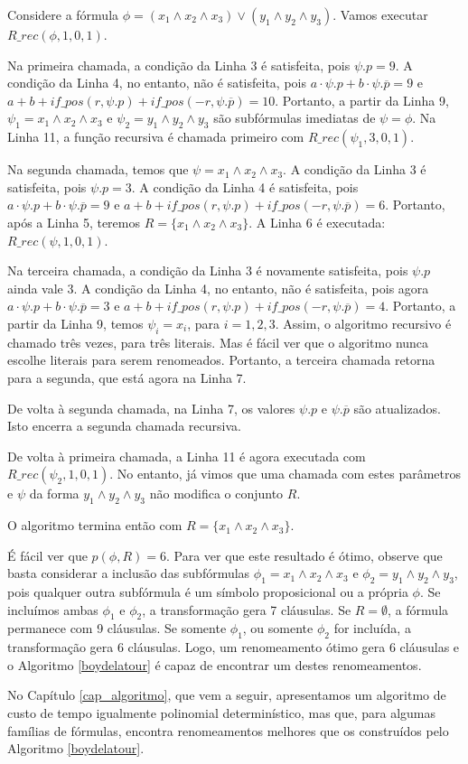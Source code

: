 \begin{example}
	Considere a fórmula $\phi = (x_1 \wedge x_2 \wedge x_3) \vee (y_1 \wedge y_2 \wedge y_3)$. Vamos executar $R\_rec(\phi,1,0,1)$.
	
	Na primeira chamada, a condição da Linha 3 é satisfeita, pois $\psi.p = 9$. A condição da Linha 4, no entanto, não é satisfeita, pois $a \cdot \psi.p + b \cdot \psi.\overline{p} = 9$ e $a + b + if\_pos(r,\psi.p) + if\_pos(-r,\psi.\overline{p}) = 10$. Portanto, a partir da Linha 9, $\psi_1 = x_1 \wedge x_2 \wedge x_3$ e $\psi_2 = y_1 \wedge y_2 \wedge y_3$ são subfórmulas imediatas de $\psi = \phi$. Na Linha 11, a função recursiva é chamada primeiro com $R\_rec(\psi_1,3,0,1)$.
	
	Na segunda chamada, temos que $\psi = x_1 \wedge x_2 \wedge x_3$. A condição da Linha 3 é satisfeita, pois $\psi.p = 3$. A condição da Linha 4 é satisfeita, pois $a \cdot \psi.p + b \cdot \psi.\overline{p} = 9$ e $a + b + if\_pos(r,\psi.p) + if\_pos(-r,\psi.\overline{p}) = 6$. Portanto, após a Linha 5, teremos $R = \{x_1 \wedge x_2 \wedge x_3 \}$. A Linha 6 é executada: $R\_rec(\psi,1,0,1)$.
	
	Na terceira chamada, a condição da Linha 3 é novamente satisfeita, pois $\psi.p$ ainda vale 3. A condição da Linha 4, no entanto, não é satisfeita, pois agora $a \cdot \psi.p + b \cdot \psi.\overline{p} = 3$ e $a + b + if\_pos(r,\psi.p) + if\_pos(-r,\psi.\overline{p}) = 4$. Portanto, a partir da Linha 9, temos $\psi_i = x_i$, para $i=1,2,3$. Assim, o algoritmo recursivo é chamado três vezes, para três literais. Mas é fácil ver que o algoritmo nunca escolhe literais para serem renomeados. Portanto, a terceira chamada retorna para a segunda, que está agora na Linha 7.
	
	De volta à segunda chamada, na Linha 7, os valores $\psi.p$ e $\psi.\overline{p}$ são atualizados. Isto encerra a segunda chamada recursiva.
	
	De volta à primeira chamada, a Linha 11 é agora executada com $R\_rec(\psi_2,1,0,1)$. No entanto, já vimos que uma chamada com estes parâmetros e $\psi$ da forma $y_1 \wedge y_2 \wedge y_3$ não modifica o conjunto $R$.
	
	O algoritmo termina então com $R = \{x_1 \wedge x_2 \wedge x_3 \}$.
	
	É fácil ver que $p(\phi,R) = 6$. Para ver que este resultado é ótimo, observe que basta considerar a inclusão das subfórmulas $\phi_1 = x_1 \wedge x_2 \wedge x_3$ e $\phi_2 = y_1 \wedge y_2 \wedge y_3$, pois qualquer outra subfórmula é um símbolo proposicional ou a própria $\phi$. Se incluímos ambas $\phi_1$ e $\phi_2$, a transformação gera 7 cláusulas. Se $R = \emptyset$, a fórmula permanece com 9 cláusulas. Se somente $\phi_1$, ou somente $\phi_2$ for incluída, a transformação gera 6 cláusulas. Logo, um renomeamento ótimo gera 6 cláusulas e o Algoritmo \ref{boydelatour} é capaz de encontrar um destes renomeamentos.
\end{example}

No Capítulo \ref{cap_algoritmo}, que vem a seguir, apresentamos um algoritmo de custo de tempo igualmente polinomial determinístico, mas que, para algumas famílias de fórmulas, encontra renomeamentos melhores que os construídos pelo Algoritmo \ref{boydelatour}.
